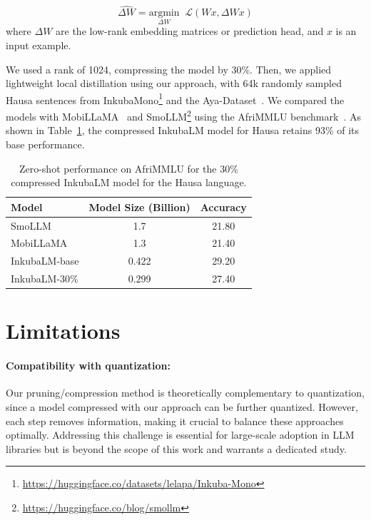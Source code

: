 \[
\widehat{\Delta W} = \underset{{\Delta W}}{\mathrm{argmin}} \;\; \mathcal{L}(Wx, \Delta Wx)
\]
where $\Delta W$ are the low-rank embedding matrices or prediction head, and $x$ is an input example.

We used a rank of 1024, compressing the model by 30\%. Then, we applied lightweight local distillation using our approach, with 64k randomly sampled Hausa sentences from InkubaMono\footnote{\url{https://huggingface.co/datasets/lelapa/Inkuba-Mono}} and the Aya-Dataset~\citep{singh2024aya}. We compared the models with MobiLLaMA~\citep{thawakar2024mobillama} and SmoLLM\footnote{\url{https://huggingface.co/blog/smollm}} using the AfriMMLU benchmark~\citep{afrimmlu}. As shown in Table~\ref{tab:inkuba-ch2}, the compressed InkubaLM model for Hausa retains 93\% of its base performance.

\begin{table}[h!]
    \centering
    {\small{
    \begin{tabular}{lcc}
    \toprule
    \textbf{Model} & \textbf{Model Size (Billion)} & \textbf{Accuracy} \\
    \midrule
    SmoLLM & 1.7 & 21.80 \\
    MobiLLaMA & 1.3 & 21.40 \\
    \midrule
    InkubaLM-base & 0.422 & 29.20 \\
    InkubaLM-30\% & 0.299 & 27.40 \\
    \bottomrule
    \end{tabular}
    }}
    \caption{Zero-shot performance on AfriMMLU for the 30\% compressed InkubaLM model for the Hausa language.}
    \label{tab:inkuba-ch2}
\end{table}

\section{Limitations}

\paragraph{Compatibility with quantization:}
Our pruning/compression method is theoretically complementary to quantization, since a model compressed with our approach can be further quantized. However, each step removes information, making it crucial to balance these approaches optimally. Addressing this challenge is essential for large-scale adoption in LLM libraries but is beyond the scope of this work and warrants a dedicated study.

